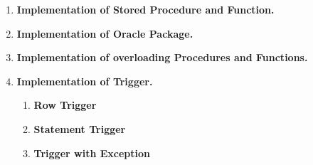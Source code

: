 \documentclass[12pt,a4paper]{report}
\begin{document}
\begin{enumerate}
	\item{ \fontsize{14}{12} \textbf{Implementation of Stored Procedure and Function.} }						
	\clearpage
	\newpage

	\item{ \fontsize{14}{12} \textbf{Implementation of Oracle Package.} }		
	\clearpage
	\newpage				
	
	\item{ \fontsize{14}{12} \textbf{Implementation of overloading Procedures and Functions.} }	
	\clearpage
	\newpage
	
	\item{ \fontsize{14}{12} \textbf{Implementation of Trigger.} }{
		\begin{enumerate}
			\item{ \fontsize{14}{12} \textbf{Row Trigger}}
			\item{ \fontsize{14}{12} \textbf{Statement Trigger}}			
			\item{ \fontsize{14}{12} \textbf{Trigger with Exception}}						
		\end{enumerate}
	}
	\clearpage
	\newpage							
	
\end{enumerate}	
	
\end{document}
